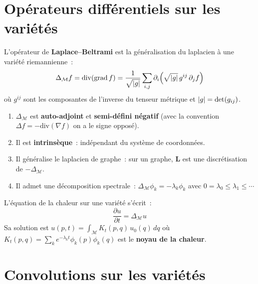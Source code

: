 \section{Op\'erateurs diff\'erentiels sur les vari\'et\'es}

\begin{definition}
L'op\'erateur de \textbf{Laplace--Beltrami} est la g\'en\'eralisation du
laplacien \`a une vari\'et\'e riemannienne~:
\[
    \Delta_{\mathcal{M}} f = \mathrm{div}(\mathrm{grad}\, f)
    = \frac{1}{\sqrt{\left| g \right|}} \sum_{i,j} \partial_i\!\left(\sqrt{\left| g \right|}\,
    g^{ij}\, \partial_j f\right)
\]
o\`u $g^{ij}$ sont les composantes de l'inverse du tenseur m\'etrique et
$\left| g \right| = \det(g_{ij})$.
\end{definition}

\begin{theoreme}
\begin{enumerate}
    \item $\Delta_{\mathcal{M}}$ est \textbf{auto-adjoint} et \textbf{semi-d\'efini n\'egatif}
          (avec la convention $\Delta f = -\mathrm{div}(\nabla f)$ on a le signe oppos\'e).
    \item Il est \textbf{intrins\`eque}~: ind\'ependant du syst\`eme de coordonn\'ees.
    \item Il g\'en\'eralise le laplacien de graphe~: sur un graphe, $\mathbf{L}$
          est une discr\'etisation de $-\Delta_{\mathcal{M}}$.
    \item Il admet une d\'ecomposition spectrale~:
          $\Delta_{\mathcal{M}} \phi_k = -\lambda_k \phi_k$ avec
          $0 = \lambda_0 \leq \lambda_1 \leq \cdots$
\end{enumerate}
\end{theoreme}

\begin{proposition}
L'\'equation de la chaleur sur une vari\'et\'e s'\'ecrit~:
\[
    \frac{\partial u}{\partial t} = \Delta_{\mathcal{M}} u
\]
Sa solution est $u(p, t) = \int_{\mathcal{M}} K_t(p, q)\, u_0(q)\, dq$ o\`u
$K_t(p,q) = \sum_k e^{-\lambda_k t} \phi_k(p) \phi_k(q)$ est le
\textbf{noyau de la chaleur}.
\end{proposition}

\section{Convolutions sur les vari\'et\'es}

